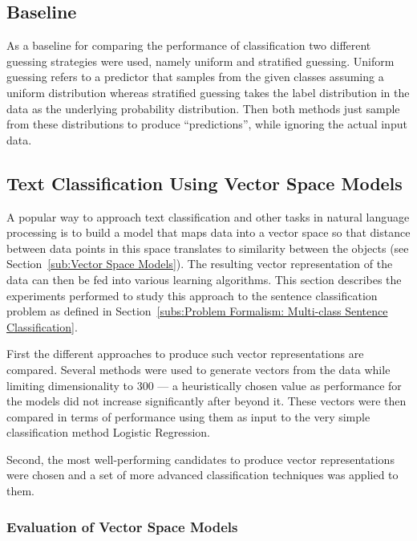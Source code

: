\subsection{Baseline}
\label{par:Baseline}

As a baseline for comparing the performance of classification two different guessing strategies were used, namely uniform and stratified guessing.
Uniform guessing refers to a predictor that samples from the given classes assuming a uniform distribution whereas stratified guessing takes the label distribution in the data as the underlying probability distribution.
Then both methods just sample from these distributions to produce ``predictions'', while ignoring the actual input data.


\subsection{Text Classification Using Vector Space Models}
\label{sub:Text Classification Using Vector Space Models}

A popular way to approach text classification and other tasks in natural language processing is to build a model that maps data into a vector space so that distance between data points in this space translates to similarity between the objects (see Section~\ref{sub:Vector Space Models}). The resulting vector representation of the data can then be fed into various learning algorithms. This section describes the experiments performed to study this approach to the sentence classification problem as defined in Section~\ref{subs:Problem Formalism: Multi-class Sentence Classification}.

First the different approaches to produce such vector representations are compared. Several methods were used to generate vectors from the data while limiting dimensionality to 300 --- a heuristically chosen value as performance for the models did not increase significantly after beyond it. These vectors were then compared in terms of performance using them as input to the very simple classification method Logistic Regression.

Second, the most well-performing candidates to produce vector representations were chosen and a set of more advanced classification techniques was applied to them.


\subsubsection*{Evaluation of Vector Space Models}
\label{subs:Evaluation of Vector Space Models}

